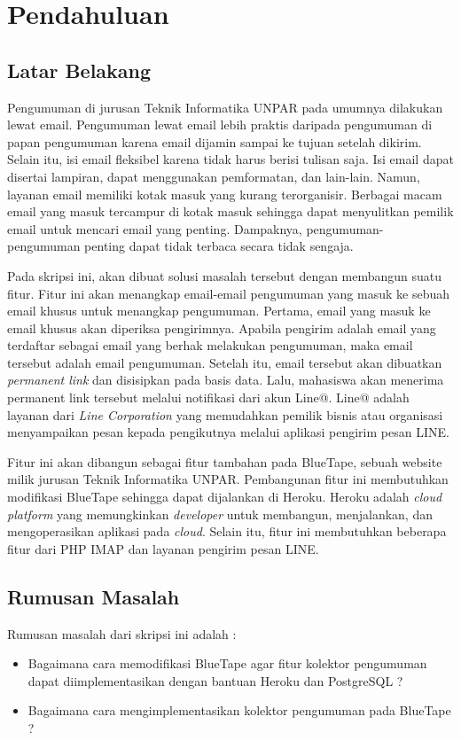 \chapter{Pendahuluan}
\label{chap:pendahuluan}
   
\section{Latar Belakang}
\label{sec:latarBelakang}
Pengumuman di jurusan Teknik Informatika UNPAR pada umumnya dilakukan lewat email. Pengumuman lewat email lebih praktis daripada pengumuman di papan pengumuman karena email dijamin sampai ke tujuan setelah dikirim. Selain itu, isi email fleksibel karena tidak harus berisi tulisan saja. Isi email dapat disertai lampiran, dapat menggunakan pemformatan, dan lain-lain. Namun, layanan email memiliki kotak masuk yang kurang terorganisir. Berbagai macam email yang masuk tercampur di kotak masuk sehingga dapat menyulitkan pemilik email untuk mencari email yang penting. Dampaknya, pengumuman-pengumuman penting dapat tidak terbaca secara tidak sengaja.

Pada skripsi ini, akan dibuat solusi masalah tersebut dengan membangun suatu fitur. Fitur ini akan menangkap email-email pengumuman yang masuk ke sebuah email khusus untuk menangkap pengumuman. Pertama, email yang masuk ke email khusus akan diperiksa pengirimnya. Apabila pengirim adalah email yang terdaftar sebagai email yang berhak melakukan pengumuman, maka email tersebut adalah email pengumuman. Setelah itu, email tersebut akan dibuatkan \textit{permanent link} dan disisipkan pada basis data. Lalu, mahasiswa akan menerima permanent link tersebut melalui notifikasi dari akun Line@. Line@ adalah layanan dari \textit{Line Corporation} yang memudahkan pemilik bisnis atau organisasi menyampaikan pesan kepada pengikutnya melalui aplikasi pengirim pesan LINE.

Fitur ini akan dibangun sebagai fitur tambahan pada BlueTape, sebuah website milik jurusan Teknik Informatika UNPAR. Pembangunan fitur ini membutuhkan modifikasi BlueTape sehingga dapat dijalankan di Heroku. Heroku adalah \textit{cloud platform} yang memungkinkan \textit{developer} untuk membangun, menjalankan, dan mengoperasikan aplikasi pada \textit{cloud}. Selain itu, fitur ini membutuhkan beberapa fitur dari PHP IMAP dan layanan pengirim pesan LINE.

\section{Rumusan Masalah}
\label{sec:rumusanmasalah}
Rumusan masalah dari skripsi ini adalah : 
\begin{itemize}
\item Bagaimana cara memodifikasi BlueTape agar fitur kolektor pengumuman dapat diimplementasikan dengan bantuan Heroku dan PostgreSQL ?
\item Bagaimana cara mengimplementasikan kolektor pengumuman pada BlueTape ?
\end{itemize}

